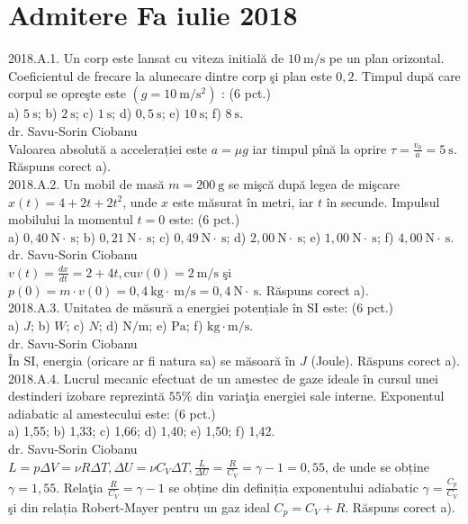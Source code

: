 \section{Admitere Fa iulie 2018}

2018.A.1. Un corp este lansat cu viteza initială de $10 \mathrm{~m} / \mathrm{s}$ pe un plan orizontal. Coeficientul de frecare la alunecare dintre corp şi plan este $0,2$. Timpul după care corpul se opreşte este $\left(g=10 \mathrm{~m} / \mathrm{s}^{2}\right)$ : (6 pct.)\\ a) $5 \mathrm{~s}$; b) $2 \mathrm{~s}$; c) $1 \mathrm{~s}$; d) $0,5 \mathrm{~s}$; e) $10 \mathrm{~s}$; f) $8 \mathrm{~s}$.\\ dr. Savu-Sorin Ciobanu\\ Valoarea absolută a accelerației este $a=\mu g$ iar timpul pînă la oprire $\tau=\frac{v_{0}}{a}=5 \mathrm{~s}$. Răspuns corect a).\\

2018.A.2. Un mobil de masă $m=200 \mathrm{~g}$ se mişcă după legea de mişcare $x(t)=4+2 t+2 t^{2}$, unde $x$ este măsurat în metri, iar $t$ în secunde. Impulsul mobilului la momentul $t=0$ este: (6 pct.)\\ a) $0,40 \mathrm{~N} \cdot \mathrm{~s}$; b) $0,21 \mathrm{~N} \cdot \mathrm{~s}$; c) $0,49 \mathrm{~N} \cdot \mathrm{~s}$; d) $2,00 \mathrm{~N} \cdot \mathrm{~s}$; e) $1,00 \mathrm{~N} \cdot \mathrm{~s}$; f) $4,00 \mathrm{~N} \cdot \mathrm{~s}$.\\ dr. Savu-Sorin Ciobanu\\ $v(t)=\frac{d x}{d t}=2+4 t, \mathrm{cu} v(0)=2 \mathrm{~m} / \mathrm{s}$ şi $p(0)=m \cdot v(0)=0,4 \mathrm{~kg} \cdot \mathrm{~m} / \mathrm{s}=0,4 \mathrm{~N} \cdot \mathrm{~s}$. Răspuns corect a).\\

2018.A.3. Unitatea de măsură a energiei potențiale în SI este: (6 pct.)\\ a) $J$; b) $W$; c) $N$; d) $\mathrm{N} / \mathrm{m}$; e) $\mathrm{Pa}$; f) $\mathrm{kg} \cdot \mathrm{m} / \mathrm{s}$.\\ dr. Savu-Sorin Ciobanu\\ În SI, energia (oricare ar fi natura sa) se măsoară în $J$ (Joule). Răspuns corect a).\\

2018.A.4. Lucrul mecanic efectuat de un amestec de gaze ideale în cursul unei destinderi izobare reprezintă $55 \%$ din variaţia energiei sale interne. Exponentul adiabatic al amestecului este: (6 pct.)\\ a) 1,55; b) 1,33; c) 1,66; d) 1,40; e) 1,50; f) 1,42.\\ dr. Savu-Sorin Ciobanu\\ $L=p \Delta V=\nu R \Delta T, \Delta U=\nu C_{V} \Delta T, \frac{L}{\Delta U}=\frac{R}{C_{V}}=\gamma-1=0,55$, de unde se obține $\gamma=1,55$. Relaţia $\frac{R}{C_{V}}=\gamma-1$ se obține din definiția exponentului adiabatic $\gamma=\frac{C_{p}}{C_{V}}$ şi din relația Robert-Mayer pentru un gaz ideal $C_{p}=C_{V}+R$. Răspuns corect a).\\ 

